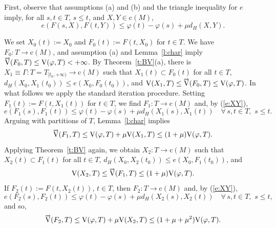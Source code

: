 \documentclass[preprint,12pt]{elsarticle}
\newcommand{\eq}[1]{\mbox{\rm(\ref{#1})}}
\newcommand{\nV}{\mbox{\rm V}}
\newcommand{\riV}{{\scriptstyle\overrightarrow{\mbox{\rm V}}}}
\begin{document}
\begin{pf}
First, observe that assumptions (a) and (b) and the triangle inequality for $e$ imply,
for all $s,t\in T$, $s\le t$, and $X,Y\in\mbox{c}(M)$,
  \begin{equation} \label{e:XY}
e(F(s,X),F(t,Y))\le\varphi(t)-\varphi(s)+\mu d_H(X,Y).
  \end{equation}

We set $X_0(t)\!:=\!X_0$ and $F_0(t)\!:=\!F(t,X_0)$ for $t\in T$. We have
\mbox{$F_0:T\to\mbox{c}(M)$}, and assumption (a) and Lemma~\ref{l:char} imply
$\riV(F_0,T)\le\nV(\varphi,T)<+\infty$. By Theorem~\ref{t:BV}(a), there is
$X_1\equiv\Gamma:T=T_{[t_0,+\infty)}\to\mbox{c}(M)$ such that
$X_1(t)\subset F_0(t)$ for all $t\in T$, $d_H(X_0,X_1(t_0))\le e(X_0,F_0(t_0))$, and
$\nV(X_1,T)\le\riV(F_0,T)\le\nV(\varphi,T)$. In what follows we apply the standard
iteration procedure. Setting $F_1(t):=F(t,X_1(t))$ for $t\in T$, we find
$F_1:T\to\mbox{c}(M)$ and, by \eq{e:XY},
  \begin{equation*}
e(F_1(s),F_1(t))\le\varphi(t)-\varphi(s)+\mu d_H(X_1(s),X_1(t))\quad
  \forall\,s,t\in T,\,\,s\le t.
  \end{equation*}
Arguing with partitions of $T$, Lemma~\ref{l:char} implies
  \begin{equation*}
\riV(F_1,T)\le\nV(\varphi,T)+\mu\nV(X_1,T)\le(1+\mu)\nV(\varphi,T).
  \end{equation*}
Applying Theorem~\ref{t:BV} again, we obtain $X_2:T\to\mbox{c}(M)$ such that
$X_2(t)\subset F_1(t)$ for all $t\in T$, $d_H(X_0,X_2(t_0))\le e(X_0,F_1(t_0))$, and
  \begin{equation*}
\nV(X_2,T)\le\riV(F_1,T)\le(1+\mu)\nV(\varphi,T).
  \end{equation*}
If $F_2(t)\!:=\!F(t,X_2(t))$, $t\in T$, then $F_2:T\to\mbox{c}(M)$ and, by \eq{e:XY},
  \begin{equation*}
e(F_2(s),F_2(t))\le\varphi(t)-\varphi(s)+\mu d_H(X_2(s),X_2(t))\quad
  \forall\,s,t\in T,\,\,s\le t,
  \end{equation*}
and so,
  \begin{equation*}
\riV(F_2,T)\le\nV(\varphi,T)+\mu\nV(X_2,T)\le(1+\mu+\mu^2)\nV(\varphi,T).
  \end{equation*}


\end{pf}
\end{document}
